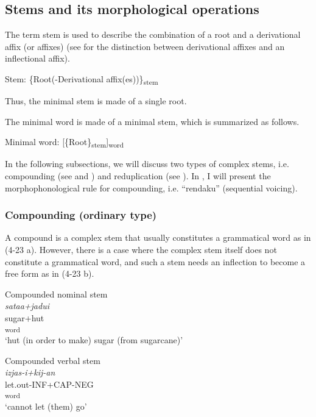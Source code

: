 \subsection{Stems and its morphological operations}\label{sec:4.2.3}

The term stem is used to describe the combination of a root and a derivational affix (or affixes) (see  for the distinction between derivational affixes and an inflectional affix).

\ea  Stem: \{Root(-Derivational affix(es))\}\textsubscript{stem} \label{ex:4.21} \z

Thus, the minimal stem is made of a single root.

The minimal word is made of a minimal stem, which is summarized as follows.

\ea  Minimal word: [\{Root\}\textsubscript{stem}]\textsubscript{word} \label{ex:4.22}\z

In the following subsections, we will discuss two types of complex stems, i.e. compounding (see  and ) and reduplication (see ). In , I will present the morphophonological rule for compounding, i.e. “rendaku” (sequential voicing).

\subsubsection{Compounding (ordinary type)}\label{sec:4.2.3.1}

A compound is a complex stem that usually constitutes a grammatical word as in (4-23 a). However, there is a case where the complex stem itself does not constitute a grammatical word, and such a stem needs an inflection to become a free form as in (4-23 b).

\ea \label{ex:4.23}
\ea Compounded nominal stem \label{ex:4.23a}\\
 \glll \textit{sataa+jadui}\\
    sugar+hut\\
    [\{Stem\textsubscript{1}+Stem\textsubscript{2}\}\textsubscript{compound}]\textsubscript{word}\\
    \glt ‘hut (in order to make) sugar (from sugarcane)’
    
\ex Compounded verbal stem\\
\glll \textit{izjas-i+kij-an}\\
    let.out-INF+CAP-NEG\\
    [\{Stem\textsubscript{1}+Stem\textsubscript{2}\}\textsubscript{compound}{}-Affix]\textsubscript{word}\\
\glt    ‘cannot let (them) go’
\z
\z

